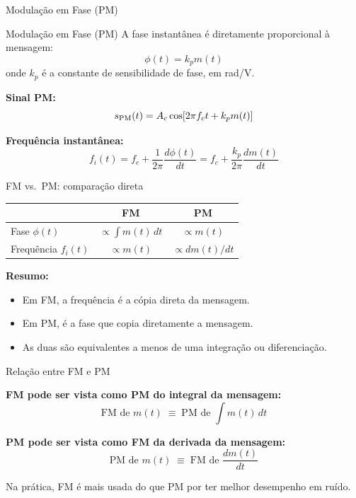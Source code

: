 \begin{frame}{Modulação em Fase (PM)}

\begin{block}{Modulação em Fase (PM)}
A fase instantânea é diretamente proporcional à mensagem:
\[
\phi(t) = k_p m(t)
\]
onde $k_p$ é a constante de sensibilidade de fase, em rad/V.
\end{block}

\textbf{Sinal PM:}
\[
s_{\text{PM}}(t) = A_c \cos[2\pi f_c t + k_p m(t)]
\]

\pause
\textbf{Frequência instantânea:}
\[
f_i(t) = f_c + \frac{1}{2\pi}\frac{d\phi(t)}{dt} = f_c + \frac{k_p}{2\pi} \frac{dm(t)}{dt}
\]

\end{frame}


\begin{frame}{FM vs.\ PM: comparação direta}

\begin{center}
\renewcommand{\arraystretch}{1.4}
\begin{tabular}{|l|c|c|}
\hline
                        & \textbf{FM}                       & \textbf{PM} \\
\hline
Fase $\phi(t)$          & $\propto \int m(t)\,dt$           & $\propto m(t)$ \\
\hline
Frequência $f_i(t)$     & $\propto m(t)$                    & $\propto dm(t)/dt$ \\
\hline
\end{tabular}
\end{center}

\vspace{0.4cm}
\textbf{Resumo:}
\begin{itemize}
\item Em FM, a frequência é a cópia direta da mensagem.
\item Em PM, é a fase que copia diretamente a mensagem.
\item As duas são equivalentes a menos de uma integração ou diferenciação.
\end{itemize}

\end{frame}


\begin{frame}{Relação entre FM e PM}

\textbf{FM pode ser vista como PM do integral da mensagem:}
\[
\text{FM de } m(t) \;\equiv\; \text{PM de } \int m(t)\,dt
\]

\pause
\textbf{PM pode ser vista como FM da derivada da mensagem:}
\[
\text{PM de } m(t) \;\equiv\; \text{FM de } \frac{dm(t)}{dt}
\]

\vspace{0.4cm}
\pause
Na prática, FM é mais usada do que PM por ter melhor desempenho em ruído.

\end{frame}

